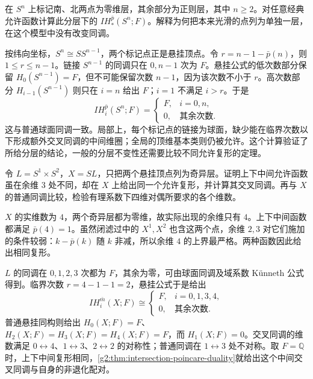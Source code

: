 \begin{exercise}\label{g2:ex:marked-sphere-intersection}
	在 \(S^n\) 上标记南、北两点为零维层，其余部分为正则层，其中 \(n\ge2\)。对任意经典允许函数计算此分层下的 \(IH_*^{\bar p}(S^n;F)\)。解释为何把本来光滑的点列为单独一层，在这个模型中没有改变同调。
\end{exercise}
\begin{solution}
	按纬向坐标，\(S^n\cong SS^{n-1}\)，两个标记点正是悬挂顶点。令 \(r=n-1-\bar p(n)\)，则 \(1\le r\le n-1\)。链接 \(S^{n-1}\) 的同调只在 \(0,n-1\) 次为 \(F\)。悬挂公式的低次数部分保留 \(H_0(S^{n-1})=F\)，但不可能保留次数 \(n-1\)，因为该次数不小于 \(r\)。高次数部分 \(H_{i-1}(S^{n-1})\) 则只在 \(i=n\) 给出 \(F\)；\(i=1\) 不满足 \(i>r\)。于是
	\[
		IH_i^{\bar p}(S^n;F)=
		\begin{cases}F,&i=0,n,\\0,&\text{其余次数}.
		\end{cases}
	\]
	这与普通球面同调一致。局部上，每个标记点的链接为球面，缺少能在临界次数以下形成额外交叉同调的中间维圈；全局的顶维基本类则仍被允许。这个计算验证了所给分层的结论，一般的分层不变性还需要比较不同允许复形的定理。
\end{solution}

\begin{exercise}\label{g2:ex:even-codimension-middle}
	令 \(L=S^1\times S^2\)，\(X=SL\)，只把两个悬挂顶点列为奇异层。证明上下中间允许函数虽在余维 \(3\) 处不同，却在 \(X\) 上给出同一个允许复形，并计算其交叉同调。再与 \(X\) 的普通同调比较，检验有理系数下四维对偶所要求的各个维数。
\end{exercise}
\begin{solution}
	\(X\) 的实维数为 \(4\)，两个奇异层都为零维，故实际出现的余维只有 \(4\)。上下中间函数都满足 \(\bar p(4)=1\)。虽然闭滤过中的 \(X^1,X^2\) 也含这两个点，余维 \(2,3\) 对它们施加的条件较弱：\(k-\bar p(k)\) 随 \(k\) 非减，所以余维 \(4\) 的上界最严格。两种函数因此给出相同复形。

	\(L\) 的同调在 \(0,1,2,3\) 次都为 \(F\)，其余为零，可由球面同调及域系数 Künneth 公式得到。临界次数 \(r=4-1-1=2\)，悬挂公式于是给出
	\[
		IH_i^{\bar m}(X;F)\cong
		\begin{cases}F,&i=0,1,3,4,\\0,&\text{其余次数}.
		\end{cases}
	\]
	普通悬挂同构则给出 \(H_0(X;F)=F\)、\(H_2(X;F)=H_3(X;F)=H_4(X;F)=F\)，而 \(H_1(X;F)=0\)。交叉同调的维数满足 \(0\leftrightarrow4\)、\(1\leftrightarrow3\)、\(2\leftrightarrow2\) 的对称性；普通同调在 \(1\leftrightarrow3\) 处不对称。取 \(F=\mathbb Q\) 时，上下中间复形相同，\cref{g2:thm:intersection-poincare-duality}就给出这个中间交叉同调与自身的非退化配对。
\end{solution}

